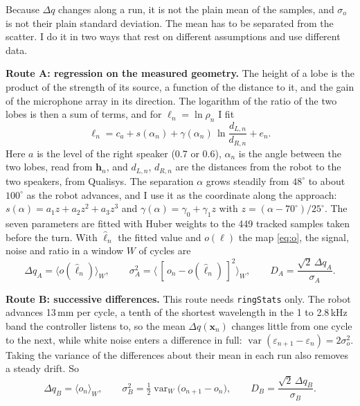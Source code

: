 \documentclass[11pt,a4paper]{article}
\newcommand{\dq}{\Delta q}
\newcommand{\so}{\sigma_o}
\newcommand{\code}[1]{\texttt{#1}}
\begin{document}
Because $\dq$ changes along a run, it is not the plain mean of the samples, and $\so$ is not their plain standard
deviation. The mean has to be separated from the scatter. I do it in two ways that rest on different
assumptions and use different data.

\textbf{Route A: regression on the measured geometry.} The height of a lobe is the product of the strength of
its source, a function of the distance to it, and the gain of the microphone array in its direction. The logarithm of
the ratio of the two lobes is then a sum of terms, and for $\ell_n=\ln\rho_n$ I fit
\begin{equation}
\ell_n=c_a+s(\alpha_n)+\gamma(\alpha_n)\,\ln\frac{d_{L,n}}{d_{R,n}}+e_n . \label{eq:routeA}
\end{equation}
Here $a$ is the level of the right speaker (0.7 or 0.6), $\alpha_n$ is the angle between the two lobes, read from
$\bm{h}_n$, and $d_{L,n}$, $d_{R,n}$ are the distances from the robot to the two speakers, from Qualisys. The
separation $\alpha$ grows steadily from $48^\circ$ to about $100^\circ$ as the robot advances, and I use it as the
coordinate along the approach: $s(\alpha)=a_1z+a_2z^2+a_3z^3$ and $\gamma(\alpha)=\gamma_0+\gamma_1z$ with
$z=(\alpha-70^\circ)/25^\circ$. The seven parameters are fitted with Huber weights to the 449 tracked samples
taken before the turn. With $\hat\ell_n$ the fitted value and $o(\ell)$ the map \eqref{eq:o}, the signal, noise and
ratio in a window $W$ of cycles are
\begin{equation}
\dq_A=\big\langle o(\hat\ell_n)\big\rangle_W,\qquad
\sigma_A^2=\big\langle\,[\,o_n-o(\hat\ell_n)\,]^2\big\rangle_W,\qquad
D_A=\frac{\sqrt2\,\dq_A}{\sigma_A}. \label{eq:A}
\end{equation}

\textbf{Route B: successive differences.} This route needs \code{ringStats} only. The robot advances 13\,mm
per cycle, a tenth of the shortest wavelength in the 1 to 2.8\,kHz band the controller listens to, so the mean
$\dq(\bm{x}_n)$ changes little from one cycle to the next, while white noise enters a difference in full:
$\operatorname{var}(\varepsilon_{n+1}-\varepsilon_n)=2\so^2$. Taking the variance of the differences about
their mean in each run also removes a steady drift. So
\begin{equation}
\dq_B=\big\langle o_n\big\rangle_W,\qquad
\sigma_B^2=\tfrac12\operatorname{var}_W\!\big(o_{n+1}-o_n\big),\qquad
D_B=\frac{\sqrt2\,\dq_B}{\sigma_B}. \label{eq:B}
\end{equation}
\end{document}
